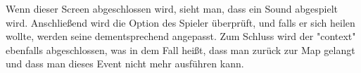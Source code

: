 Wenn dieser Screen abgeschlossen wird, sieht man, dass ein Sound abgespielt wird.
Anschließend wird die Option des Spieler überprüft, und falls er sich heilen wollte, werden seine dementsprechend angepasst.
Zum Schluss wird der "context" ebenfalls abgeschlossen, was in dem Fall heißt, dass man zurück zur Map gelangt und dass man dieses Event nicht mehr ausführen kann.